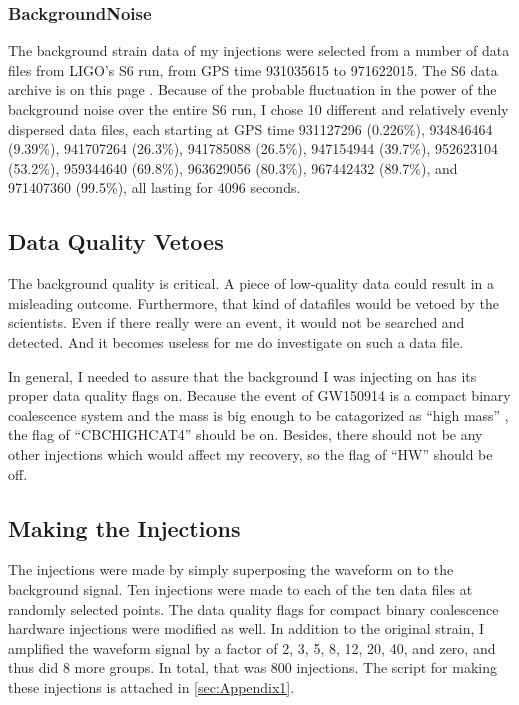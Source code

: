 \documentclass[aps,prd,preprint]{revtex4}
\begin{document}
\subsubsection{Background\textemdash Noise \label{sec:dataFile}}
The background strain data of my injections were selected from a number of data files from LIGO's S6 run, from GPS time 931035615 to 971622015. The S6 data archive is on this page \cite{S6Data}. Because of the probable fluctuation in the power of the background noise over the entire S6 run, I chose 10 different and relatively evenly dispersed data files, each starting at GPS time 931127296 (0.226\%), 934846464 (9.39\%), 941707264 (26.3\%), 941785088 (26.5\%), 947154944 (39.7\%), 952623104 (53.2\%), 959344640 (69.8\%), 963629056 (80.3\%), 967442432 (89.7\%), and 971407360 (99.5\%), all lasting for 4096 seconds.

\subsection{Data Quality Vetoes}
The background quality is critical. A piece of low-quality data could result in a misleading outcome. Furthermore, that kind of datafiles would be vetoed by the scientists. Even if there really were an event, it would not be searched and detected. And it becomes useless for me do investigate on such a data file.
\par In general, I needed to assure that the background I was injecting on has its proper data quality flags on. Because the event of GW150914 is a compact binary coalescence system \cite{O1} and the mass is big enough to be catagorized as \enquote{high mass} \cite{S6himass}, the flag of \enquote{CBCHIGH\textunderscore CAT4} should be on. Besides, there should not be any other injections which would affect my recovery, so the flag of \enquote{HW} should be off. \cite{S6DQ}
 
\subsection{Making the Injections}
The injections were made by simply superposing the waveform on to the background signal. Ten injections were made to each of the ten data files at randomly selected points. The data quality flags for compact binary coalescence hardware injections were modified as well. In addition to the original strain, I amplified the waveform signal by a factor of 2, 3, 5, 8, 12, 20, 40, and zero, and thus did 8 more groups. In total, that was 800 injections. The script for making these injections is attached in \ref{sec:Appendix1}.
\end{document}

